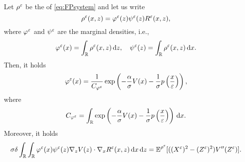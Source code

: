\documentclass[10pt]{article}
\begin{document}
\begin{lemma}\label{lem:FPMarginal} Let $\rho^\varepsilon$ be the  of \eqref{eq:FPsystem} and let us write 
\begin{equation}\label{eq:densityDecomposition}
	\rho^\varepsilon(x, z) = \varphi^\varepsilon(z)\psi^\varepsilon(z)R^\varepsilon(x,z),
\end{equation}
where $\varphi^\varepsilon$ and $\psi^\varepsilon$ are the marginal densities, i.e., 
\begin{equation}
	\varphi^\varepsilon(x) = \int_{\mathbb{R}} \rho^\varepsilon(x,z) \,\mathrm{d} z, \quad  \psi^\varepsilon(z) = \int_{\mathbb{R}} \rho^\varepsilon(x,z) \,\mathrm{d} x.
\end{equation}
Then, it holds
\begin{equation}\label{eq:marginalX}
	\varphi^\varepsilon(x) = \frac{1}{C_{\varphi^\varepsilon}} \exp\left(- \frac{\alpha}{\sigma} V(x) - \frac{1}{\sigma} p \left ( \frac{x}{\varepsilon} \right )\right),
\end{equation}
where
\begin{equation}
	C_{\varphi^\varepsilon} = \int_{\mathbb{R}} \exp\left(- \frac{\alpha}{\sigma} V(x) - \frac{1}{\sigma} p \left ( \frac{x}{\varepsilon} \right )\right) \,\mathrm{d} x.
\end{equation}
Moreover, it holds
\begin{equation}
	\sigma \delta \int_{\mathbb{R}} \int_{\mathbb{R}} \varphi^\varepsilon(x) \psi^\varepsilon(z) \nabla_z V(z) \cdot \nabla_x R^\varepsilon(x,z) \,\mathrm{d} x \,\mathrm{d} z = \operatorname{\mathbb{E}}^{\rho^\varepsilon}[((X^\varepsilon)^2 - (Z^\varepsilon)^2)V''(Z^\varepsilon)].
\end{equation}
\end{lemma}
\end{document}
